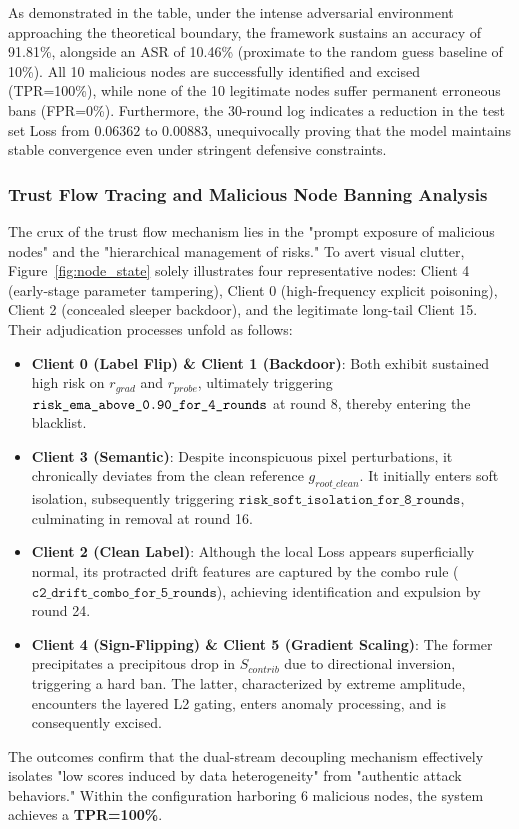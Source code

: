 \documentclass[runningheads,orivec]{llncs}
\begin{document}
As demonstrated in the table, under the intense adversarial environment approaching the theoretical boundary, the framework sustains an accuracy of 91.81\%, alongside an ASR of 10.46\% (proximate to the random guess baseline of 10\%). All 10 malicious nodes are successfully identified and excised (TPR=100\%), while none of the 10 legitimate nodes suffer permanent erroneous bans (FPR=0\%). Furthermore, the 30-round log indicates a reduction in the test set Loss from $0.06362$ to $0.00883$, unequivocally proving that the model maintains stable convergence even under stringent defensive constraints.

\subsubsection{Trust Flow Tracing and Malicious Node Banning Analysis}
The crux of the trust flow mechanism lies in the "prompt exposure of malicious nodes" and the "hierarchical management of risks." To avert visual clutter, Figure~\ref{fig:node_state} solely illustrates four representative nodes: Client 4 (early-stage parameter tampering), Client 0 (high-frequency explicit poisoning), Client 2 (concealed sleeper backdoor), and the legitimate long-tail Client 15. Their adjudication processes unfold as follows:
\begin{itemize}
    \item \textbf{Client 0 (Label Flip) \& Client 1 (Backdoor)}: Both exhibit sustained high risk on $r_{grad}$ and $r_{probe}$, ultimately triggering\newline
          $\texttt{risk\_ema\_above\_0.90\_\allowbreak for\_4\_\allowbreak rounds}$ at round 8, thereby entering the blacklist.
    \item \textbf{Client 3 (Semantic)}: Despite inconspicuous pixel perturbations, it chronically deviates from the clean reference $g_{root\_clean}$. It initially enters soft isolation, subsequently triggering $\texttt{risk\_soft\_isolation\_for\_8\_rounds}$, culminating in removal at round 16.
    \item \textbf{Client 2 (Clean Label)}: Although the local Loss appears superficially normal, its protracted drift features are captured by the combo rule ($\texttt{c2\_drift\_combo\_for\_5\_rounds}$), achieving identification and expulsion by round 24.
    \item \textbf{Client 4 (Sign-Flipping) \& Client 5 (Gradient Scaling)}: The former precipitates a precipitous drop in $S_{contrib}$ due to directional inversion, triggering a hard ban. The latter, characterized by extreme amplitude, encounters the layered L2 gating, enters anomaly processing, and is consequently excised.
\end{itemize}
The outcomes confirm that the dual-stream decoupling mechanism effectively isolates "low scores induced by data heterogeneity" from "authentic attack behaviors." Within the configuration harboring 6 malicious nodes, the system achieves a \textbf{TPR=100\%}.
\end{document}
